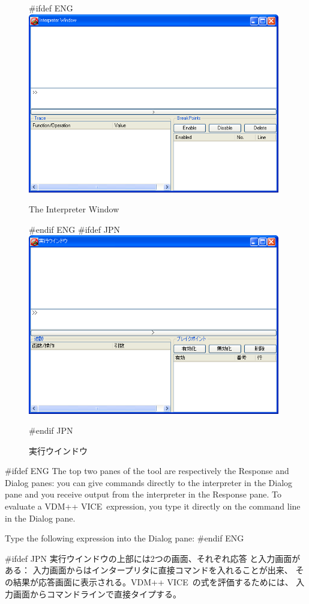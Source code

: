 \documentclass[\pformat,12pt]{article}
\newcommand{\vdmslpp}{VDM-SL}
\newcommand{\vdmslpp}{VDM++}
\renewcommand{\vdmslpp}{VDM++ VICE}
\newcommand{\guicmd}[1]{{\sf #1}}
\newcommand{\guicmd}[1]{{\gt #1}}
\begin{document}
\begin{figure}[tbh]
\begin{center}
#ifdef ENG
\includegraphics[width=11cm]{interpreterWindowENG.png}
\caption{The Interpreter Window}
#endif ENG
#ifdef JPN
\includegraphics[width=11cm]{interpreterWindow.png}
\caption{実行ウインドウ}
#endif JPN
\label{fig:interpwin}
\end{center}
\end{figure}

#ifdef ENG
The top two panes of the tool are respectively the
\guicmd{Response} and \guicmd{Dialog} panes: you
can give commands directly to the interpreter in the
\guicmd{Dialog} pane and you receive output from the
interpreter in the \guicmd{Response} pane. To evaluate a \vdmslpp\
expression, you type it directly on the command line in the
\guicmd{Dialog} pane.

Type the following expression into the \guicmd{Dialog} pane:
#endif ENG

#ifdef JPN
実行ウインドウの上部には2つの画面、それぞれ\guicmd{応答} と\guicmd{入力}画面がある：
\guicmd{入力}画面からはインタープリタに直接コマンドを入れることが出来、
その結果が\guicmd{応答}画面に表示される。\vdmslpp\ の式を評価するためには、
\guicmd{入力}画面からコマンドラインで直接タイプする。 
\end{document}
